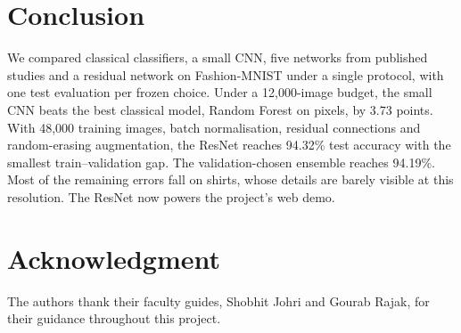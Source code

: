 \documentclass[conference]{IEEEtran}
\begin{document}
\section{Conclusion}
We compared classical classifiers, a small CNN, five networks from published studies and a residual network on Fashion-MNIST under a single protocol, with one test evaluation per frozen choice. Under a 12,000-image budget, the small CNN beats the best classical model, Random Forest on pixels, by 3.73 points. With 48,000 training images, batch normalisation, residual connections and random-erasing augmentation, the ResNet reaches 94.32\% test accuracy with the smallest train--validation gap. The validation-chosen ensemble reaches 94.19\%. Most of the remaining errors fall on shirts, whose details are barely visible at this resolution. The ResNet now powers the project's web demo.

\section*{Acknowledgment}
The authors thank their faculty guides, Shobhit Johri and Gourab Rajak, for their guidance throughout this project.
\end{document}
